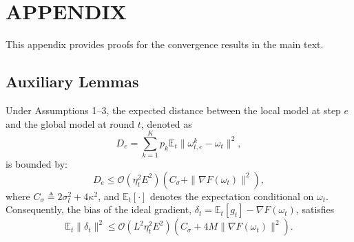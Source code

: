 \section*{APPENDIX}

This appendix provides proofs for the convergence results in the main text.

\subsection{Auxiliary Lemmas}

\begin{lemma}
Under Assumptions 1--3, the expected distance between the local model at step $e$ and the global model at round $t$, denoted as
\begin{equation}
D_e = \sum_{k=1}^K p_k \mathbb{E}_t\|\omega_{t,e}^k - \omega_t\|^2,
\end{equation}
is bounded by:
\begin{equation}
D_e \le \mathcal{O}(\eta_t^2 E^2) \left( C_\sigma + \|\nabla F(\omega_t)\|^2 \right),
\end{equation}
where $C_\sigma \triangleq 2\sigma_l^2 + 4\kappa^2$, and $\mathbb{E}_t[\cdot]$ denotes the expectation conditional on $\omega_t$. Consequently, the bias of the ideal gradient, $\delta_t = \mathbb{E}_t[g_t] - \nabla F(\omega_t)$, satisfies
\begin{equation}
\mathbb{E}_t\|\delta_t\|^2 \le \mathcal{O}(L^2\eta_t^2 E^2)(C_\sigma + 4M\|\nabla F(\omega_t)\|^2).
\end{equation}
\end{lemma}

